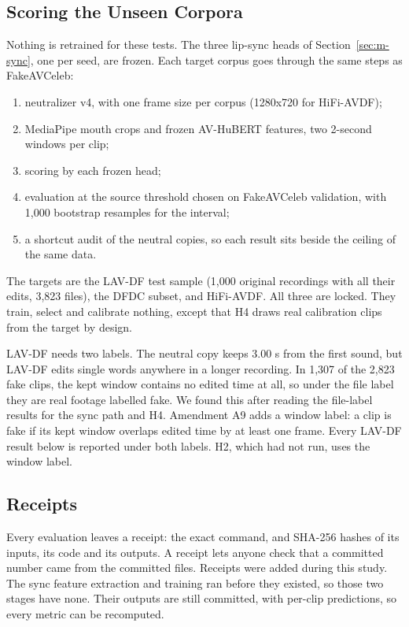 \subsection{Scoring the Unseen Corpora}
\label{sec:s-targets}

Nothing is retrained for these tests. The three lip-sync heads of Section~\ref{sec:m-sync}, one per seed, are frozen. Each target corpus goes
through the same steps as FakeAVCeleb:

\begin{enumerate}
    \item neutralizer v4, with one frame size per corpus (1280x720 for
    HiFi-AVDF);
    \item MediaPipe mouth crops and frozen AV-HuBERT features, two 2-second
    windows per clip;
    \item scoring by each frozen head;
    \item evaluation at the source threshold chosen on FakeAVCeleb
    validation, with 1,000 bootstrap resamples for the interval;
    \item a shortcut audit of the neutral copies, so each result sits beside
    the ceiling of the same data.
\end{enumerate}

The targets are the LAV-DF test sample (1,000 original recordings with all
their edits, 3,823 files), the DFDC subset, and HiFi-AVDF. All three are
locked. They train, select and calibrate nothing, except that H4 draws real
calibration clips from the target by design.

LAV-DF needs two labels. The neutral copy keeps 3.00 s from the first sound,
but LAV-DF edits single words anywhere in a longer recording. In 1,307 of the
2,823 fake clips, the kept window contains no edited time at all, so under the
file label they are real footage labelled fake. We found this after reading
the file-label results for the sync path and H4. Amendment A9 adds a window
label: a clip is fake if its kept window overlaps edited time by at least one
frame. Every LAV-DF result below is reported under both labels. H2, which had
not run, uses the window label.

\subsection{Receipts}

Every evaluation leaves a receipt: the exact command, and SHA-256 hashes of its
inputs, its code and its outputs. A receipt lets anyone check that a committed
number came from the committed files. Receipts were added during this study.
The sync feature extraction and training ran before they existed, so those two
stages have none. Their outputs are still committed, with per-clip predictions,
so every metric can be recomputed.

